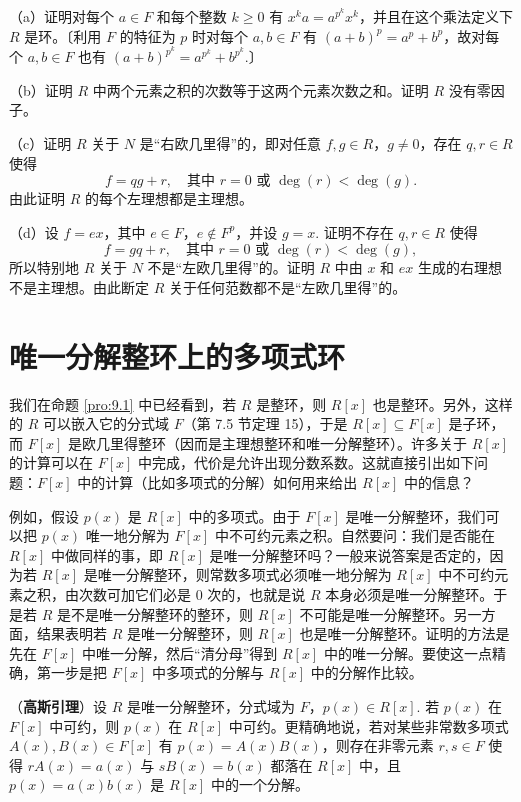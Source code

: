 \begin{enumerate}
（a）证明对每个 \(a \in F\) 和每个整数 \(k \geq 0\) 有 \(x^ka = a^{p^k}x^k\)，并且在这个乘法定义下 \(R\) 是环。〔利用 \(F\) 的特征为 \(p\) 时对每个 \(a, b \in F\) 有 \((a+b)^p = a^p+b^p\)，故对每个 \(a, b \in F\) 也有 \((a+b)^{p^k} = a^{p^k}+b^{p^k}\).〕

（b）证明 \(R\) 中两个元素之积的次数等于这两个元素次数之和。证明 \(R\) 没有零因子。

（c）证明 \(R\) 关于 \(N\) 是“右欧几里得”的，即对任意 \(f, g \in R\)，\(g \neq 0\)，存在 \(q, r \in R\) 使得
\[
f = qg + r, \quad \text{其中 } r = 0 \text{ 或 } \deg(r) < \deg(g).
\]
由此证明 \(R\) 的每个左理想都是主理想。

（d）设 \(f = ex\)，其中 \(e \in F\)，\(e \notin F^p\)，并设 \(g = x\). 证明不存在 \(q, r \in R\) 使得
\[
f = gq + r, \quad \text{其中 } r = 0 \text{ 或 } \deg(r) < \deg(g),
\]
所以特别地 \(R\) 关于 \(N\) 不是“左欧几里得”的。证明 \(R\) 中由 \(x\) 和 \(ex\) 生成的右理想不是主理想。由此断定 \(R\) 关于任何范数都不是“左欧几里得”的。
\end{enumerate}

\section{唯一分解整环上的多项式环}

我们在命题 \ref{pro:9.1} 中已经看到，若 \(R\) 是整环，则 \(R[x]\) 也是整环。另外，这样的 \(R\) 可以嵌入它的分式域 \(F\)（第 7.5 节定理 15），于是 \(R[x] \subseteq F[x]\) 是子环，而 \(F[x]\) 是欧几里得整环（因而是主理想整环和唯一分解整环）。许多关于 \(R[x]\) 的计算可以在 \(F[x]\) 中完成，代价是允许出现分数系数。这就直接引出如下问题：\(F[x]\) 中的计算（比如多项式的分解）如何用来给出 \(R[x]\) 中的信息？

例如，假设 \(p(x)\) 是 \(R[x]\) 中的多项式。由于 \(F[x]\) 是唯一分解整环，我们可以把 \(p(x)\) 唯一地分解为 \(F[x]\) 中不可约元素之积。自然要问：我们是否能在 \(R[x]\) 中做同样的事，即 \(R[x]\) 是唯一分解整环吗？一般来说答案是否定的，因为若 \(R[x]\) 是唯一分解整环，则常数多项式必须唯一地分解为 \(R[x]\) 中不可约元素之积，由次数可加它们必是 0 次的，也就是说 \(R\) 本身必须是唯一分解整环。于是若 \(R\) 是不是唯一分解整环的整环，则 \(R[x]\) 不可能是唯一分解整环。另一方面，结果表明若 \(R\) 是唯一分解整环，则 \(R[x]\) 也是唯一分解整环。证明的方法是先在 \(F[x]\) 中唯一分解，然后“清分母”得到 \(R[x]\) 中的唯一分解。要使这一点精确，第一步是把 \(F[x]\) 中多项式的分解与 \(R[x]\) 中的分解作比较。

\begin{proposition}\label{pro:9.5}
（\textbf{高斯引理}）设 \(R\) 是唯一分解整环，分式域为 \(F\)，\(p(x) \in R[x]\). 若 \(p(x)\) 在 \(F[x]\) 中可约，则 \(p(x)\) 在 \(R[x]\) 中可约。更精确地说，若对某些非常数多项式 \(A(x), B(x) \in F[x]\) 有 \(p(x) = A(x)B(x)\)，则存在非零元素 \(r, s \in F\) 使得 \(rA(x) = a(x)\) 与 \(sB(x) = b(x)\) 都落在 \(R[x]\) 中，且 \(p(x) = a(x)b(x)\) 是 \(R[x]\) 中的一个分解。
\end{proposition}

